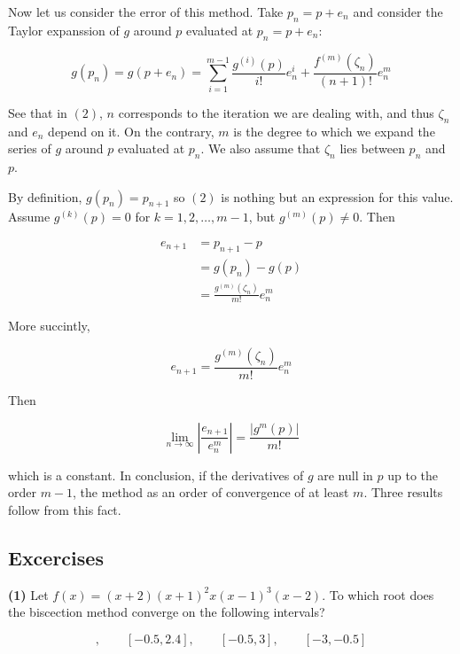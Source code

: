 \documentclass[12pt]{article}
\theoremstyle{definition}
\begin{document}
Now let us consider the error of this method. Take $p_n = p + e_n$ and consider
the Taylor expanssion of $g$ around $p$ evaluated at $p_n = p+e_n$:

\begin{equation}
    g(p_n) = g(p + e_n) = \sum_{i=1}^{m-1} \frac{ g^{(i)}(p) }{i!} e_n^{i} +
    \frac{f^{(m)}(\zeta_n)}{(n+1)!} e_{n}^{m}
\end{equation}

See that in $(2)$, $n$ corresponds to the iteration we are dealing with, and
thus $\zeta_n$ and $e_n$ depend on it. On the contrary, $m$ is the degree to
which we expand the series of $g$ around $p$ evaluated at $p_n$. We also assume
that $\zeta_n$ lies between $p_n$ and $p$.

By definition, $g(p_n) = p_{n+1}$ so $(2)$ is nothing but an expression for this
value. Assume $g^{(k)}(p) = 0$ for $k = 1, 2, \ldots, m-1$, but $g^{(m)}(p) \neq
0$. Then 

\begin{align*}
    e_{n+1} 
    &= p_{n+1} - p\\ 
    &=g(p_n) - g(p) \\ 
    &=\frac{ g^{(m)}\left( \zeta_n \right)  }{m!}e_n^m 
\end{align*}

More succintly,

\begin{equation*}
    e_{n+1} = \frac{ g^{(m)}\left( \zeta_n \right)  }{m!}e_n^m 
\end{equation*}

Then 

\begin{equation*}
    \lim_{n \to \infty} \left| \frac{e_{n+1}}{e_n^m} \right|  = 
    \frac{\left| g^m(p) \right| }{m!}
\end{equation*}

which is a constant. In conclusion, if the derivatives of $g$ are null in $p$ up
to the order $m-1$, the method as an order of convergence of at least $m$. Three
results follow from this fact. 

\pagebreak 


\subsection{Excercises}

\begin{shaded}
    \textbf{(1)} Let $f(x) = (x+2)(x+1)^2 x(x-1)^3(x-2)$. To which root does
    the biscection method converge on the following intervals? 

    \begin{equation*}
        [-1.5, 2.5], \qquad [-0.5, 2.4], \qquad [-0.5, 3], \qquad [-3, -0.5]
    \end{equation*}
\end{shaded}
\end{document}
